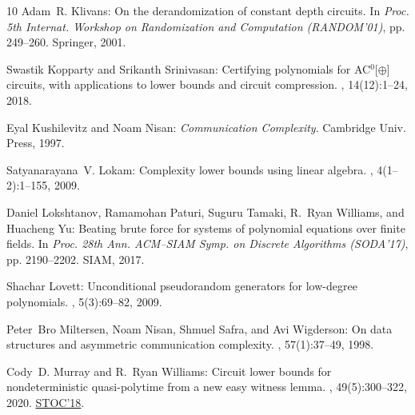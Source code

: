 \documentclass[11pt]{article}
\begin{document}
\begin{thebibliography}{10}
{\sc Adam~R. Klivans}: On the derandomization of constant depth circuits.
\newblock In {\em Proc. 5th Internat. Workshop on Randomization and Computation
  (RANDOM'01)}, pp. 249--260. Springer, 2001.
\newblock [\epfmtdoi{10.1007/3-540-44666-4\_28}]

{\sc Swastik Kopparty and Srikanth Srinivasan}: Certifying polynomials for
  {AC}\({}^{\mbox{0}}\)[{\(\oplus\)}] circuits, with applications to lower
  bounds and circuit compression.
, 14(12):1--24, 2018.

{\sc Eyal Kushilevitz and Noam Nisan}: {\em Communication Complexity}.
\newblock Cambridge Univ. Press, 1997.

{\sc Satyanarayana~V. Lokam}: Complexity lower bounds using linear algebra.
, 4(1--2):1--155, 2009.
\newblock [\epfmtdoi{10.1561/0400000011}]

{\sc Daniel Lokshtanov, Ramamohan Paturi, Suguru Tamaki, R.~Ryan Williams, and
  Huacheng Yu}: Beating brute force for systems of polynomial equations over
  finite fields.
\newblock In {\em Proc. 28th Ann. ACM--SIAM Symp. on Discrete Algorithms
  (SODA'17)}, pp. 2190--2202. SIAM, 2017.
\newblock [\epfmtdoi{10.1137/1.9781611974782.143}]

{\sc Shachar Lovett}: Unconditional pseudorandom generators for low-degree
  polynomials.
, 5(3):69--82, 2009.

{\sc Peter~Bro Miltersen, Noam Nisan, Shmuel Safra, and Avi Wigderson}: On data
  structures and asymmetric communication complexity.
, 57(1):37--49, 1998.

{\sc Cody~D. Murray and R.~Ryan Williams}: Circuit lower bounds for
  nondeterministic quasi-polytime from a new easy witness lemma.
, 49(5):300--322, 2020.
\newblock \prelim \href{https://doi.org/10.1145/3188745.3188910}{STOC'18}.
\newblock [\epfmtdoi{10.1137/18M1195887}]


\end{thebibliography}
\end{document}

